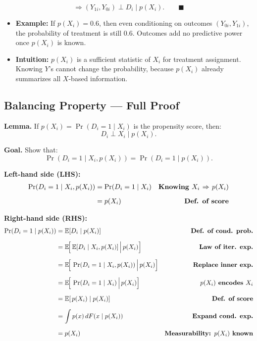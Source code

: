\documentclass[12pt]{article}
\begin{document}
\[
\Rightarrow (Y_{1i}, Y_{0i}) \perp D_i \mid p(X_i). 
\qquad \blacksquare
\]

\begin{itemize}
    \item \textbf{Example:} If $p(X_i)=0.6$, then even conditioning on outcomes $(Y_{0i},Y_{1i})$, the probability of treatment is still $0.6$. Outcomes add no predictive power once $p(X_i)$ is known.  
    \item \textbf{Intuition:} $p(X_i)$ is a sufficient statistic of $X_i$ for treatment assignment. Knowing $Y$’s cannot change the probability, because $p(X_i)$ already summarizes all $X$-based information.  
\end{itemize}

\subsection*{\noindent\textbf{Balancing Property — Full Proof}}

\textbf{Lemma.}  
If $p(X_i)=\Pr(D_i=1 \mid X_i)$ is the propensity score, then:
\[
D_i \perp X_i \mid p(X_i).
\]

\textbf{Goal.} Show that:
\[
\Pr(D_i=1 \mid X_i, p(X_i)) = \Pr(D_i=1 \mid p(X_i)).
\]

\textbf{Left-hand side (LHS):}
\singlespacing
\begin{align}
\Pr(D_i=1 \mid X_i, p(X_i)) 
  &= \Pr(D_i=1 \mid X_i) 
  & \text{\textbf{Knowing $X_i$ $\Rightarrow$ $p(X_i)$}} \\[6pt]
  &= p(X_i) 
  & \text{\textbf{Def. of score}}
\end{align}

\textbf{Right-hand side (RHS):}
\singlespacing
\begin{align}
\Pr(D_i=1 \mid p(X_i)) 
  &= \mathbb{E}[D_i \mid p(X_i)] 
  & \text{\textbf{Def. of cond. prob.}} \\[6pt]
  &= \mathbb{E}\!\Big[\, \mathbb{E}[D_i \mid X_i, p(X_i)] \,\Big|\, p(X_i)\Big] 
  & \text{\textbf{Law of iter. exp.}} \\[6pt]
  &= \mathbb{E}\!\Big[\, \Pr(D_i=1 \mid X_i, p(X_i)) \,\Big|\, p(X_i)\Big] 
  & \text{\textbf{Replace inner exp.}} \\[6pt]
  &= \mathbb{E}\!\Big[\, \Pr(D_i=1 \mid X_i) \,\Big|\, p(X_i)\Big] 
  & \text{\textbf{$p(X_i)$ encodes $X_i$}} \\[6pt]
  &= \mathbb{E}[\, p(X_i) \mid p(X_i)] 
  & \text{\textbf{Def. of score}} \\[6pt]
  &= \int p(x)\, dF(x \mid p(X_i)) 
  & \text{\textbf{Expand cond. exp.}} \\[6pt]
  &= p(X_i) 
  & \text{\textbf{Measurability: $p(X_i)$ known}}
\end{align}
\end{document}
